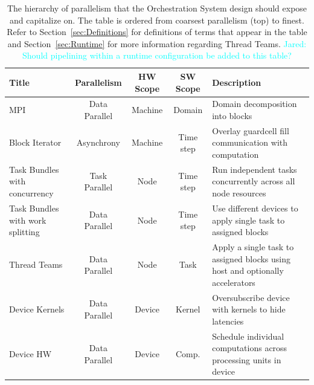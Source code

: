 \documentclass{article}
\newcommand{\Jared}[1]          {\textcolor{cyan}{Jared: #1}}
\begin{document}
\begin{table}[!t]
\label{tab:ParallelHierarchy}
\caption{The hierarchy of parallelism that the Orchestration System design
should expose and capitalize on.  The table is ordered from coarsest parallelism
(top) to finest.  Refer to Section~\ref{sec:Definitions} for definitions of
terms that appear in the table and Section~\ref{sec:Runtime} for more
information regarding Thread Teams.  \Jared{Should pipelining within a
runtime configuration be added to this table?}}

\begin{center}

\begin{tabular}{|p{1.1in}|c|c|c|p{2.25in}|}
\hline
Title & Parallelism & HW Scope & SW Scope & Description\\
\hline
\hline
MPI                              & Data Parallel & Machine & Domain    & Domain decomposition into blocks\\
\hline
Block Iterator                   & Asynchrony    & Machine & Time step & Overlay guardcell fill communication with computation\\
\hline
Task Bundles with concurrency    & Task Parallel & Node    & Time step & Run independent tasks concurrently across all node resources\\
\hline
Task Bundles with work splitting & Data Parallel & Node    & Time step & Use different devices to apply single task to assigned blocks\\ 
\hline
Thread Teams                     & Data Parallel & Node    & Task      & Apply a single task to assigned blocks using host and optionally accelerators\\
\hline
Device Kernels                   & Data Parallel & Device  & Kernel    & Oversubscribe device with kernels to hide latencies\\
\hline
Device HW                        & Data Parallel & Device  & Comp.     & Schedule individual computations across processing units in device\\
\hline
\end{tabular}

\end{center}
\end{table}
\end{document}
